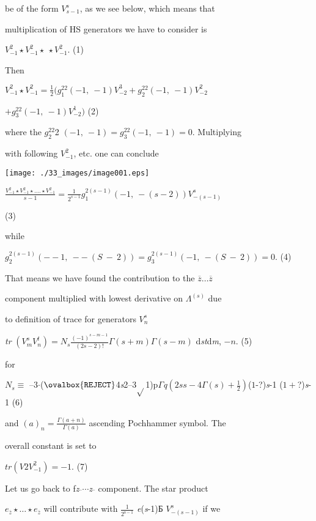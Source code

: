 \documentclass[a4paper,12pt]{article}
\begin{document}
be of the form $V_{s-1}^{s}$, as we see below, which means that

multiplication of HS generators we have to consider is
\begin{center}
$V_{-1}^{2}\star V_{-1}^{2}\star\ \star V_{-1}^{2}$.   (1)
\end{center}
Then

$V_{-1}^{2}\displaystyle \star V_{-1}^{2}=\frac{1}{2}(g_{1}^{22}(-1,\ -1)V_{-2}^{3}+g_{2}^{22}(-1,\ -1)V_{-2}^{2}$
\begin{center}
$+g_{3}^{22}(-1,\ -1)V_{-2}^{1})$   (2)
\end{center}
where the $g_{2}^{22}$2 $(- 1,\ -1) =g_{3}^{22}(-1,\ -1) = 0$. Multiplying

with following $V_{-1}^{2}$, etc. one can conclude
\begin{center}
\texttt{[image: ./33\_images/image001.eps]}
\end{center}
$\displaystyle \frac{V_{-1}^{2}\star V_{-1}^{2}\star\ldots.\star V_{-1}^{2}}{s-1}=\frac{1}{2^{s-1}}g_{1}^{2(s-1)}(-1,\ -(s-2))V_{-(s-1)}^{s}$

(3)

while

$g_{2}^{2(s-1)} (-- 1,\ --\ (S\ -\ 2)) = g_{3}^{2(s-1)}(-1,\ -(S\ -\ 2)) = 0$. (4)

That means we have found the contribution to the $\overline{z}\ldots\overline{z}$

component multiplied with lowest derivative on $\Lambda^{(s)}$ due

to definition of trace for generators $V_{n}^{s}$

{\it tr} $(V_{m}^{s}V_{n}^{t}) =N_{s}\displaystyle \frac{(-1)^{s-m-1}}{(2s-2)!}\Gamma(s+m)\Gamma(s- m)$ d{\it st}d{\it m}, $-n$. (5)

for

$ N_{s}\equiv$ --3$\cdot$($\ovalbox{\tt\small REJECT}$4{\it s}2--3$\sqrt{}$1)p$\Gamma${\it q}$(2ss-4\displaystyle \Gamma(s)+\frac{1}{2})$($1$-?){\it s}-1 ($1+$?){\it s}-1 (6)

and $(a)_{n} = \displaystyle \frac{\Gamma(a+n)}{\Gamma(a)}$ ascending Pochhammer symbol. The

overall constant is set to
\begin{center}
$tr (V2V_{-1}^{2})=-1$.   (7)
\end{center}
Let us go back to f{\it z}$\overline{}\cdots${\it z}$\overline{}$ component. The star product

$e_{\overline{z}}\star\ldots\star e_{\overline{z}}$ will contribute with $\displaystyle \frac{1}{2^{\mathrm{s}-1}}$ {\it e}({\it s}-1)Б $V_{-(s-1)}^{s}$ if we
\end{document}
